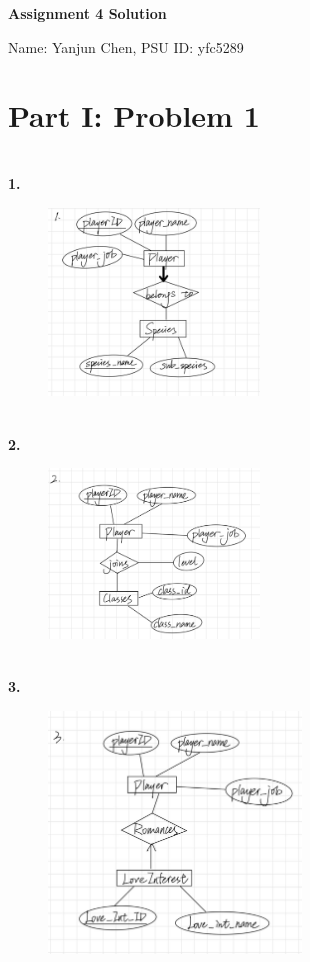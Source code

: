 \documentclass[letterpaper,11pt]{article}
\newcommand{\Paragraph}[1]{~\vspace*{-0.7\baselineskip}\\{\bf #1}}
\begin{document}
\begin{center}
	{\LARGE \bf Assignment 4 Solution}
	
	{\large
	Name: Yanjun Chen, PSU ID: yfc5289}
\end{center}

\section*{Part I: Problem 1}
\Paragraph{1. }
\begin{figure}[h]
    \centering
    \includegraphics[width=0.5\textwidth]{p1-1-1.jpg}
\end{figure}

\Paragraph{2.}
\begin{figure}[h]
    \centering
    \includegraphics[width=0.5\textwidth]{p1-1-2.jpg}
\end{figure}

\newpage
\Paragraph{3.}
\begin{figure}[h]
    \centering
    \includegraphics[width=0.6\textwidth]{p1-1-3.jpg}
\end{figure}
\end{document}
